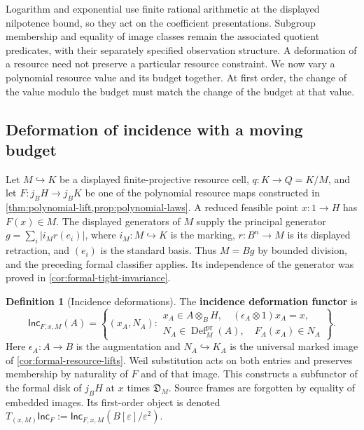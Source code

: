 \documentclass[11pt,a4paper]{article}
\numberwithin{algorithm}{section}
\numberwithin{equation}{section}
\theoremstyle{definition}
\newtheorem{definition}[definition]{Definition}
\theoremstyle{remark}
\theoremstyle{plain}
\newcommand{\incl}{\hookrightarrow}
\newcommand{\eps}{\varepsilon}
\theoremstyle{definition}
\theoremstyle{plain}
\begin{document}
Logarithm and exponential use finite rational arithmetic at the
displayed nilpotence bound, so they act on the coefficient
presentations. Subgroup membership and equality of image classes
remain the associated quotient predicates, with their separately
specified observation structure.
A deformation of a resource need not preserve a particular
resource constraint. We now vary a polynomial resource value
and its budget together. At first order, the change of the
value modulo the budget must match the change of the budget
at that value.

\subsection{Deformation of incidence with a moving budget}
\label{sec:moving-incidence}
Let $M\incl K$ be a displayed finite-projective resource cell,
$q:K\to Q=K/M$, and let $F:j_BH\to j_BK$ be one of the
polynomial resource maps constructed in
\cref{thm:polynomial-lift,prop:polynomial-laws}.
A reduced feasible point $x:1\to H$ has $F(x)\in M$.
The displayed generators of $M$ supply the principal generator
$g=\sum_i|i_Mr(e_i)|$, where $i_M:M\incl K$ is the marking,
$r:B^n\to M$ is its displayed retraction, and $(e_i)$ is the
standard basis. Thus $M=Bg$ by bounded division, and the preceding
formal classifier applies. Its independence of the generator
was proved in \cref{cor:formal-tight-invariance}.


\begin{definition}[Incidence deformations]\label{def:incidence-deformations}
The \textbf{incidence deformation functor} is
\begin{equation}\label{eq:incidence-deformation-functor}
 \mathsf{Inc}_{F,x,M}(A)=
 \left\{(x_A,N_A):
 \begin{array}{l}
 x_A\in A\otimes_BH,\quad (\epsilon_A\otimes1)x_A=x,\\
 N_A\in\operatorname{Def}^{\mathrm{pr}}_M(A),\quad F_A(x_A)\in N_A
 \end{array}\right\}.
\end{equation}
Here $\epsilon_A:A\to B$ is the augmentation and
$N_A\incl K_A$ is the universal marked image of
\cref{cor:formal-resource-lifts}. Weil substitution acts on both
entries and preserves membership by naturality of $F$ and of
that image. This constructs a subfunctor of the formal disk of
$j_BH$ at $x$ times $\mathfrak D_M$. Source frames are forgotten
by equality of embedded images. Its first-order object is denoted
$T_{(x,M)}\mathsf{Inc}_F:=\mathsf{Inc}_{F,x,M}(B[\eps]/\eps^2)$.
\end{definition}
\end{document}
